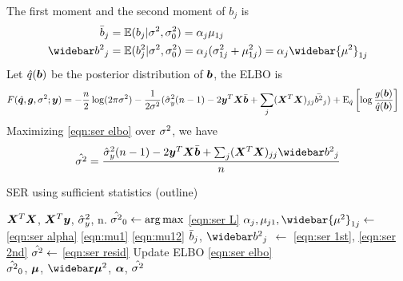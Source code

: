 The first moment and the second moment of $b_j$ is 
\begin{align}
    \bb_j &= \mathbb{E}(b_j|\rv, \rv_0) = \alpha_j \mu_{1j} \label{eqn:ser 1st}\\
    \bbb_j &= \mathbb{E}(b_j^2|\rv, \rv_0) = \alpha_j (\rv_{1j} + \mu_{1j}^2) = \alpha_j \widebar{\mu^2}_{1j} \label{eqn:ser 2nd}
\end{align}
Let $\hat{q}(\bm b)$ be the posterior distribution of $\bm b$, the ELBO is
\begin{align}
    F(\hat{{\bm q}},\bm g,\sigma^2; \bm y) &= -\frac{n}{2} \log(2\pi\sigma^2) - \frac{1}{2\sigma^2}(\hat{\sigma}_y^2 (n-1) - 2 \bm y^T\bm X \bar{\bm b} + \sum_j (\bm X^T \bm X)_{jj} \bar{b^2}_{j}) + \text{E}_{\hat{q}}\left[\log\frac{g(\bm b)}{\hat{q}(\bm b)} \right] \label{eqn:ser elbo}
\end{align}
Maximizing \eqref{eqn:ser elbo} over $\sigma^2$, we have
\begin{equation}\label{eqn:ser resid}
    \hat{\rv} = \frac{\ry (n-1) - 2 \vy^T\mx \bar{\vb} + \sum_j (\mx^T \mx)_{jj} \bbb_{j}}{n}
\end{equation}

\begin{algorithm}[H] 
\caption{SER using sufficient statistics (outline)} \label{alg:SERalg}
\begin{algorithmic}[1]
\Require $\bm X^T \bm X$, $\bm X^{T}\bm y$, $\hat{\sigma}_y^2$, n.
\Repeat
\State $\hat{\sigma^2}_0 \gets \arg \max$ \eqref{eqn:ser L}  
\State $\alpha_j, \mu_{j1}, \widebar{\mu^2}_{1j} \gets $ \eqref{eqn:ser alpha} \eqref{eqn:mu1} \eqref{eqn:mu12} 
\State $\bar{b}_j$, $\bbb_j$ $\gets$ \eqref{eqn:ser 1st}, \eqref{eqn:ser 2nd} 
\State $\hat{\sigma^2} \gets $ \eqref{eqn:ser resid} 
\State Update ELBO \eqref{eqn:ser elbo}
 \\
\Return $\hat{\sigma^2}_0$, $\bm \mu$, $\emusq$, $\bm \alpha$, $\hat{\sigma^2}$
\end{algorithmic}
\end{algorithm}

